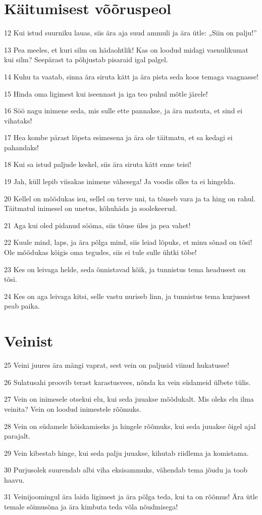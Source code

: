 \section*{Käitumisest võõruspeol}

\par 12 Kui istud suurniku lauas, siis ära aja suud ammuli ja ära ütle: „Siin on palju!”
\par 13 Pea meeles, et kuri silm on hädaohtlik! Kas on loodud midagi vaenulikumat kui silm? Seepärast ta põhjustab pisaraid igal palgel.
\par 14 Kuhu ta vaatab, sinna ära siruta kätt ja ära pista seda koos temaga vaagnasse!
\par 15 Hinda oma ligimest kui iseennast ja iga teo puhul mõtle järele!
\par 16 Söö nagu inimene seda, mis sulle ette pannakse, ja ära matsuta, et sind ei vihataks!
\par 17 Hea kombe pärast lõpeta esimesena ja ära ole täitmatu, et sa kedagi ei pahandaks!
\par 18 Kui sa istud paljude keskel, siis ära siruta kätt enne teisi!
\par 19 Jah, küll lepib viisakas inimene vähesega! Ja voodis olles ta ei hingelda.
\par 20 Kellel on mõõdukas isu, sellel on terve uni, ta tõuseb vara ja ta hing on rahul. Täitmatul inimesel on unetus, kõhuhäda ja soolekeerud.
\par 21 Aga kui oled pidanud sööma, siis tõuse üles ja pea vahet!
\par 22 Kuule mind, laps, ja ära põlga mind, siis leiad lõpuks, et minu sõnad on tõsi! Ole mõõdukas kõigis oma tegudes, siis ei tule sulle ühtki tõbe!
\par 23 Kes on leivaga helde, seda õnnistavad kõik, ja tunnistus tema headusest on tõsi.
\par 24 Kes on aga leivaga kitsi, selle vastu nuriseb linn, ja tunnistus tema kurjusest peab paika.

\section*{Veinist}

\par 25 Veini juures ära mängi vaprat, sest vein on paljusid viinud hukatusse!
\par 26 Sulatusahi proovib terast karastusvees, nõnda ka vein südameid ülbete tülis.
\par 27 Vein on inimesele otsekui elu, kui seda juuakse mõõdukalt. Mis oleks elu ilma veinita? Vein on loodud inimestele rõõmuks.
\par 28 Vein on südamele hõiskamiseks ja hingele rõõmuks, kui seda juuakse õigel ajal parajalt.
\par 29 Vein kibestab hinge, kui seda palju juuakse, kihutab riidlema ja komistama.
\par 30 Purjusolek suurendab albi viha eksisammuks, vähendab tema jõudu ja toob haavu.
\par 31 Veinijoomingul ära laida ligimest ja ära põlga teda, kui ta on rõõmus! Ära ütle temale sõimusõna ja ära kimbuta teda võla nõudmisega!

